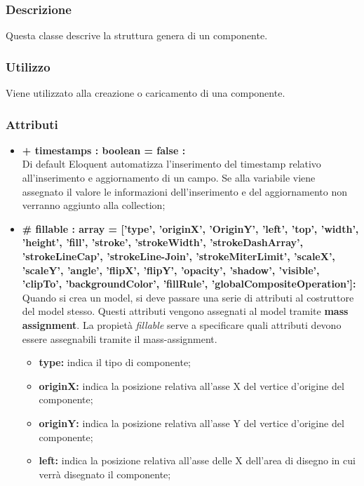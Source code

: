 
	\subsubsection*{Descrizione}
	Questa classe descrive la struttura genera di un componente.
	
	\subsubsection*{Utilizzo}
	Viene utilizzato alla creazione o caricamento di una componente.
	
	\subsubsection*{Attributi}
	\begin{itemize}
		\item \textbf{+ timestamps : boolean = false :}\\
		Di default Eloquent automatizza l'inserimento del timestamp relativo all'inserimento e aggiornamento di un campo. Se alla variabile viene assegnato il valore le informazioni dell'inserimento e del aggiornamento non verranno aggiunto alla collection;
		\item \textbf{\# fillable : array = [’type’, ’originX’, ’OriginY’, ’left’, ’top’, ’width’, ’height’, ’fill’, ’stroke’, ’strokeWidth’, ’strokeDashArray’, ’strokeLineCap’, ’strokeLine-Join’, ’strokeMiterLimit’, ’scaleX’, ’scaleY’, ’angle’, ’flipX’, ’flipY’, ’opacity’, ’shadow’, ’visible’, ’clipTo’, ’backgroundColor’, ’fillRule’, ’globalCompositeOperation']:}\\
		Quando si crea un model, si deve passare una serie di attributi al costruttore del model stesso. Questi attributi vengono assegnati al model tramite \textbf{mass assignment}. La propietà \textit{fillable} serve a specificare quali attributi devono essere assegnabili tramite il mass-assignment.
		\begin{itemize}
			\item \textbf{type:} indica il tipo di componente;
			\item \textbf{originX:} indica la posizione relativa all'asse X del vertice d'origine del componente;
			\item \textbf{originY:} indica la posizione relativa all'asse Y del vertice d'origine del componente;
			\item \textbf{left:} indica la posizione relativa all'asse delle X dell'area di disegno in cui verrà disegnato il componente;

\end{itemize}
\end{itemize}
